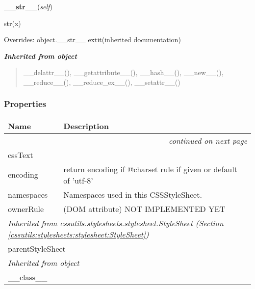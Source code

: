     \vspace{0.5ex}

\hspace{.8\funcindent}\begin{boxedminipage}{\funcwidth}

    \raggedright \textbf{\_\_str\_\_}(\textit{self})

\setlength{\parskip}{2ex}
    str(x)

\setlength{\parskip}{1ex}
      Overrides: object.\_\_str\_\_ 	extit{(inherited documentation)}

    \end{boxedminipage}


\large{\textbf{\textit{Inherited from object}}}

\begin{quote}
\_\_delattr\_\_(), \_\_getattribute\_\_(), \_\_hash\_\_(), \_\_new\_\_(), \_\_reduce\_\_(), \_\_reduce\_ex\_\_(), \_\_setattr\_\_()
\end{quote}


  \subsubsection{Properties}

    \vspace{-1cm}
\hspace{\varindent}\begin{longtable}{|p{\varnamewidth}|p{\vardescrwidth}|l}
\cline{1-2}
\cline{1-2} \centering \textbf{Name} & \centering \textbf{Description}& \\
\cline{1-2}
\endhead\cline{1-2}\multicolumn{3}{r}{\small\textit{continued on next page}}\\\endfoot\cline{1-2}
\endlastfoot\raggedright c\-s\-s\-T\-e\-x\-t\- & &\\
\cline{1-2}
\raggedright e\-n\-c\-o\-d\-i\-n\-g\- & \raggedright return encoding if @charset rule if given or default of 'utf-8'&\\
\cline{1-2}
\raggedright n\-a\-m\-e\-s\-p\-a\-c\-e\-s\- & \raggedright Namespaces used in this CSSStyleSheet.&\\
\cline{1-2}
\raggedright o\-w\-n\-e\-r\-R\-u\-l\-e\- & \raggedright (DOM attribute) NOT IMPLEMENTED YET&\\
\cline{1-2}
\multicolumn{2}{|l|}{\textit{Inherited from cssutils.stylesheets.stylesheet.StyleSheet \textit{(Section \ref{cssutils:stylesheets:stylesheet:StyleSheet})}}}\\
\multicolumn{2}{|p{\varwidth}|}{\raggedright parentStyleSheet}\\
\cline{1-2}
\multicolumn{2}{|l|}{\textit{Inherited from object}}\\
\multicolumn{2}{|p{\varwidth}|}{\raggedright \_\_class\_\_}\\
\cline{1-2}
\end{longtable}


